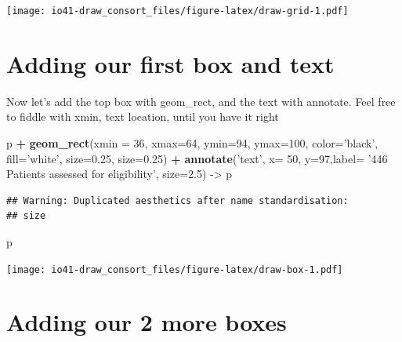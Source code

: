 \documentclass[
]{book}
\newenvironment{Shaded}{\begin{snugshade}}{\end{snugshade}}
\newcommand{\DataTypeTok}[1]{\textcolor[rgb]{0.13,0.29,0.53}{#1}}
\newcommand{\DecValTok}[1]{\textcolor[rgb]{0.00,0.00,0.81}{#1}}
\newcommand{\FloatTok}[1]{\textcolor[rgb]{0.00,0.00,0.81}{#1}}
\newcommand{\KeywordTok}[1]{\textcolor[rgb]{0.13,0.29,0.53}{\textbf{#1}}}
\newcommand{\NormalTok}[1]{#1}
\newcommand{\OperatorTok}[1]{\textcolor[rgb]{0.81,0.36,0.00}{\textbf{#1}}}
\newcommand{\StringTok}[1]{\textcolor[rgb]{0.31,0.60,0.02}{#1}}
\begin{document}
\texttt{[image: io41-draw\_consort\_files/figure-latex/draw-grid-1.pdf]}

\hypertarget{adding-our-first-box-and-text}{%
\section{Adding our first box and text}\label{adding-our-first-box-and-text}}

Now let's add the top box with geom\_rect, and the text with annotate.
Feel free to fiddle with xmin, text location, until you have it right

\begin{Shaded}
\begin{Highlighting}[]
\NormalTok{p }\OperatorTok{+}
\StringTok{  }\KeywordTok{geom_rect}\NormalTok{(}\DataTypeTok{xmin =} \DecValTok{36}\NormalTok{, }\DataTypeTok{xmax=}\DecValTok{64}\NormalTok{, }\DataTypeTok{ymin=}\DecValTok{94}\NormalTok{, }\DataTypeTok{ymax=}\DecValTok{100}\NormalTok{, }\DataTypeTok{color=}\StringTok{'black'}\NormalTok{,}
            \DataTypeTok{fill=}\StringTok{'white'}\NormalTok{, }\DataTypeTok{size=}\FloatTok{0.25}\NormalTok{, }\DataTypeTok{size=}\FloatTok{0.25}\NormalTok{) }\OperatorTok{+}
\StringTok{  }\KeywordTok{annotate}\NormalTok{(}\StringTok{'text'}\NormalTok{, }\DataTypeTok{x=} \DecValTok{50}\NormalTok{, }\DataTypeTok{y=}\DecValTok{97}\NormalTok{,}\DataTypeTok{label=} \StringTok{'446 Patients assessed for eligibility'}\NormalTok{, }\DataTypeTok{size=}\FloatTok{2.5}\NormalTok{) ->}
\StringTok{  }\NormalTok{p}
\end{Highlighting}
\end{Shaded}

\begin{verbatim}
## Warning: Duplicated aesthetics after name standardisation:
## size
\end{verbatim}

\begin{Shaded}
\begin{Highlighting}[]
\NormalTok{p}
\end{Highlighting}
\end{Shaded}

\texttt{[image: io41-draw\_consort\_files/figure-latex/draw-box-1.pdf]}

\hypertarget{adding-our-2-more-boxes}{%
\section{Adding our 2 more boxes}\label{adding-our-2-more-boxes}}
\end{document}
